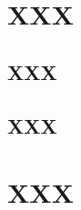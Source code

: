 \begin{appendices}
	
\chapter{XXX}\label{app:for chp4}
	
\section{XXX}

	
	\section{XXX}
	

\chapter{XXX}\label{app:for chp5}


\end{appendices}